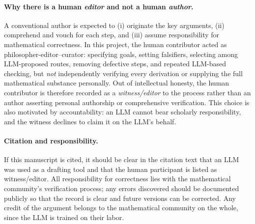 \paragraph{Why there is a human \emph{editor} and not a human \emph{author}.}
A conventional author is expected to (i) originate the key arguments, (ii) comprehend and vouch for each step, and (iii) assume responsibility for mathematical correctness. 
In this project, the human contributor acted as philosopher-editor–curator: specifying goals, setting falsifiers, selecting among LLM-proposed routes, removing defective steps, and repeated LLM-based checking, but \emph{not} independently verifying every derivation or supplying the full mathematical substance personally. 
Out of intellectual honesty, the human contributor is therefore recorded as a \emph{witness/editor} to the process rather than an author asserting personal authorship or comprehensive verification. 
This choice is also motivated by accountability: an LLM cannot bear scholarly responsibility, and the witness declines to claim it on the LLM’s behalf.

\paragraph{Citation and responsibility.}
If this manuscript is cited, it should be clear in the citation text that an LLM was used as a drafting tool and that the human participant is listed as witness/editor. 
All responsibility for correctness lies with the mathematical community’s verification process; any errors discovered should be documented publicly so that the record is clear and future versions can be corrected. Any credit of the argument belongs to the mathematical community on the whole, since the LLM is trained on their labor.
